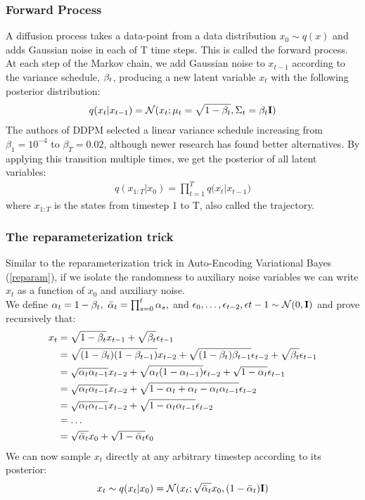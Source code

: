 \documentclass{article}
\begin{document}
\subsubsection{Forward Process}
A diffusion process takes a data-point from a data distribution $x_0 \sim q(x)$ and adds Gaussian noise in each of T time steps. This is called the forward process. At each step of the Markov chain, we add Gaussian noise to $x_{t-1}$ according to the variance schedule, $\beta_{t}$, producing a new latent variable $x_t$ with the following posterior distribution:
\begin{align}
    q(x_t|x_{t-1}) = \mathcal{N}(x_t; \mu_t=\sqrt{1-\beta_{t}}, \Sigma_t = \beta_{t}\mathbf{I})
\end{align}
The authors of DDPM selected a linear variance schedule increasing from $\beta_1 = 10^{-4}$ to $\beta_T=0.02$, although newer research has found better alternatives. By applying this transition multiple times, we get the posterior of all latent variables:
\begin{align}
    q(x_{1:T}|x_0) = \prod_{t=1}^T{q(x_t|x_{t-1}})
\end{align}
where $x_{1:T}$ is the states from timestep 1 to T, also called the trajectory.

\subsubsection{The reparameterization trick}
Similar to the reparameterization trick in Auto-Encoding Variational Bayes (\ref{reparam}), if we isolate the randomness to auxiliary noise variables we can write $x_t$ as a function of $x_0$ and auxiliary noise. \\
We define $\alpha_t=1-\beta_{t},~ \bar{\alpha}_t=\prod_{s=0}^t{\alpha_s},$ and $\epsilon_0,\ldots, \epsilon_{t-2}, \epsilon{t-1} \sim \mathcal{N}(0,\mathbf{I})$ and prove recursively that:
\begin{align}
    x_t &= \sqrt{1-\beta_{t}}x_{t-1} + \sqrt{\beta_{t}}\epsilon_{t-1} \\
    &= \sqrt{(1-\beta_{t})(1-\beta_{t-1})}x_{t-2} + \sqrt{(1-\beta_{t})\beta_{t-1}}\epsilon_{t-2} + \sqrt{\beta_{t}}\epsilon_{t-1} \\
    &= \sqrt{\alpha_t\alpha_{t-1}}x_{t-2} + \sqrt{\alpha_t(1-\alpha_{t-1})}\epsilon_{t-2} + \sqrt{1-\alpha_t}\epsilon_{t-1} \\
    &= \sqrt{\alpha_t\alpha_{t-1}}x_{t-2} + \sqrt{1-\alpha_t+\alpha_t-\alpha_t\alpha_{t-1}}\epsilon_{t-2} \\
    &= \sqrt{\alpha_t\alpha_{t-1}}x_{t-2} + \sqrt{1-\alpha_t\alpha_{t-1}}\epsilon_{t-2} \\
    &= \ldots \\
    &= \sqrt{\bar{\alpha}_t}x_0 + \sqrt{1-\bar{\alpha}_t}\epsilon_0 \label{forward_reparam}
\end{align}
We can now sample $x_t$ directly at any arbitrary timestep according to its posterior:
\begin{align}
    x_t \sim q(x_t|x_0) = \mathcal{N}(x_t;\sqrt{\bar{\alpha}_t}x_0, (1-\bar{\alpha}_t)\mathbf{I})
\end{align}
\end{document}

